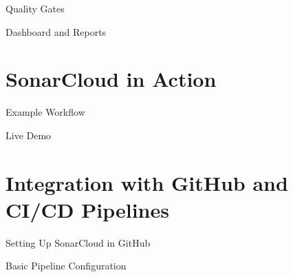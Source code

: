 \documentclass{beamer}
\begin{document}
\begin{frame}{Quality Gates}
 
\end{frame}

\begin{frame}{Dashboard and Reports}
 
\end{frame}


\section[SonarCloud in Action]{SonarCloud in Action}

\begin{frame}{Example Workflow}
 
\end{frame}

\begin{frame}{Live Demo}
 
\end{frame}

\section[ Integration with GitHub and CI/CD Pipelines]{Integration with GitHub and CI/CD Pipelines}

\begin{frame}{Setting Up SonarCloud in GitHub}
 
\end{frame}

\begin{frame}{Basic Pipeline Configuration}
 
\end{frame}
\end{document}

